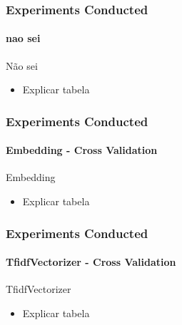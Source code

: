 \begin{frame}
	\frametitle{Experiments Conducted}
	\framesubtitle{nao sei}

	\begin{exampleblock}{Não sei} 
		\begin{itemize}
			\item Explicar tabela
		\end{itemize}
	\end{exampleblock}
	
	\begin{table}
		\centering
		\resizebox{1\textwidth}{!}{
			
		}
		\caption{nao sei}
	\end{table}

\end{frame}
\begin{frame}
	\frametitle{Experiments Conducted}
	\framesubtitle{Embedding - Cross Validation}


	\begin{exampleblock}{Embedding} 
		\begin{itemize}
			\item Explicar tabela
		\end{itemize}
	\end{exampleblock}

	
	\begin{table}
		\centering
		\resizebox{1\textwidth}{!}{
			
		}
		\caption{Embedding - Cross Validation}
	\end{table}


\end{frame}
\begin{frame}
	\frametitle{Experiments Conducted}
	\framesubtitle{TfidfVectorizer - Cross Validation}

	\begin{exampleblock}{TfidfVectorizer} 
		\begin{itemize}
			\item Explicar tabela
		\end{itemize}
	\end{exampleblock}

	
	\begin{table}
		\centering
		\resizebox{1\textwidth}{!}{
			
		}
		\caption{TfidfVectorizer - Cross Validation}
	\end{table}


\end{frame}
